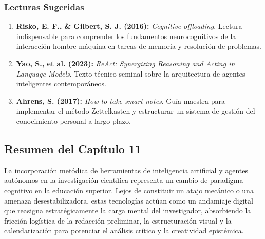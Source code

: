 \subsubsection*{Lecturas Sugeridas}
\begin{enumerate}[leftmargin=1.5em, itemsep=0.12cm]
    \item \textbf{Risko, E. F., \& Gilbert, S. J. (2016):} \textit{Cognitive offloading}. Lectura indispensable para comprender los fundamentos neurocognitivos de la interacción hombre-máquina en tareas de memoria y resolución de problemas.
    \item \textbf{Yao, S., et al. (2023):} \textit{ReAct: Synergizing Reasoning and Acting in Language Models}. Texto técnico seminal sobre la arquitectura de agentes inteligentes contemporáneos.
    \item \textbf{Ahrens, S. (2017):} \textit{How to take smart notes}. Guía maestra para implementar el método Zettelkasten y estructurar un sistema de gestión del conocimiento personal a largo plazo.
\end{enumerate}

\newpage
{}
\subsection*{Resumen del Capítulo 11}

La incorporación metódica de herramientas de inteligencia artificial y agentes autónomos en la investigación científica representa un cambio de paradigma cognitivo en la educación superior. Lejos de constituir un atajo mecánico o una amenaza desestabilizadora, estas tecnologías actúan como un andamiaje digital que reasigna estratégicamente la carga mental del investigador, absorbiendo la fricción logística de la redacción preliminar, la estructuración visual y la calendarización para potenciar el análisis crítico y la creatividad epistémica.

\vspace{0.25cm}

